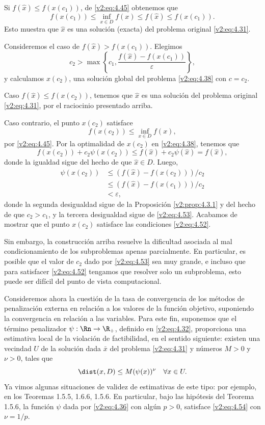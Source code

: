 Si $f(\hat{x}) \le f(x(c_1))$, de \eqref{v2:eq:4.45} obtenemos que
\[
    f(x(c_1)) \le \inf_{x \in D} f(x) \le f(\hat{x}) \le f(x(c_1)).
\]
Esto muestra que $\hat{x}$ es una solución (exacta) del problema original \eqref{v2:eq:4.31}.

Consideremos el caso de $f(\hat{x}) > f(x(c_1))$. Elegimos
\begin{equation}
    c_2 > \max \left\{ c_1, \frac{f(\hat{x}) - f(x(c_1))}{\varepsilon} \right\},
    \label{v2:eq:4.53}
\end{equation}
y calculamos $x(c_2)$, una solución global del problema \eqref{v2:eq:4.38} con $c = c_2$.

Caso $f(\hat{x}) \le f(x(c_2))$, tenemos que $\hat{x}$ es una solución del problema original \eqref{v2:eq:4.31}, por el raciocinio presentado arriba.

Caso contrario, el punto $x(c_2)$ satisface
\[
    f(x(c_2)) \le \inf_{x \in D} f(x),
\]
por \eqref{v2:eq:4.45}. Por la optimalidad de $x(c_2)$ en \eqref{v2:eq:4.38}, tenemos que
\[
    f(x(c_2)) + c_2 \psi(x(c_2)) \le f(\hat{x}) + c_2 \psi(\hat{x}) = f(\hat{x}),
\]
donde la igualdad sigue del hecho de que $\hat{x} \in D$. Luego,
\begin{align*}
    \psi(x(c_2)) &\le (f(\hat{x}) - f(x(c_2)))/c_2 \\
    &\le (f(\hat{x}) - f(x(c_1)))/c_2 \\
    &< \varepsilon,
\end{align*}
donde la segunda desigualdad sigue de la Proposición \ref{v2:prop:4.3.1} y del hecho de que $c_2 > c_1$, y la tercera desigualdad sigue de \eqref{v2:eq:4.53}. Acabamos de mostrar que el punto $x(c_2)$ satisface las condiciones \eqref{v2:eq:4.52}.

Sin embargo, la construcción arriba resuelve la dificultad asociada al mal condicionamiento de los subproblemas apenas parcialmente. En particular, es posible que el valor de $c_2$ dado por \eqref{v2:eq:4.53} sea muy grande, e incluso que para satisfacer \eqref{v2:eq:4.52} tengamos que resolver solo un subproblema, esto puede ser difícil del punto de vista computacional.

Consideremos ahora la cuestión de la tasa de convergencia de los métodos de penalización externa en relación a los valores de la función objetivo, suponiendo la convergencia en relación a las variables. Para este fin, suponemos que el término penalizador $\psi : \Rn \to \R_+$, definido en \eqref{v2:eq:4.32}, proporciona una estimativa local de la violación de factibilidad, en el sentido siguiente: existen una vecindad $U$ de la solución dada $\bar{x}$ del problema \eqref{v2:eq:4.31} y números $M > 0$ y $\nu > 0$, tales que
\begin{equation}
    \dist(x, D) \le M(\psi(x))^\nu \quad \forall x \in U.
    \label{v2:eq:4.54}
\end{equation}
Ya vimos algunas situaciones de validez de estimativas de este tipo: por ejemplo, en los Teoremas 1.5.5, 1.6.6, 1.5.6. En particular, bajo las hipótesis del Teorema 1.5.6, la función $\psi$ dada por \eqref{v2:eq:4.36} con algún $p > 0$, satisface \eqref{v2:eq:4.54} con $\nu = 1/p$.


